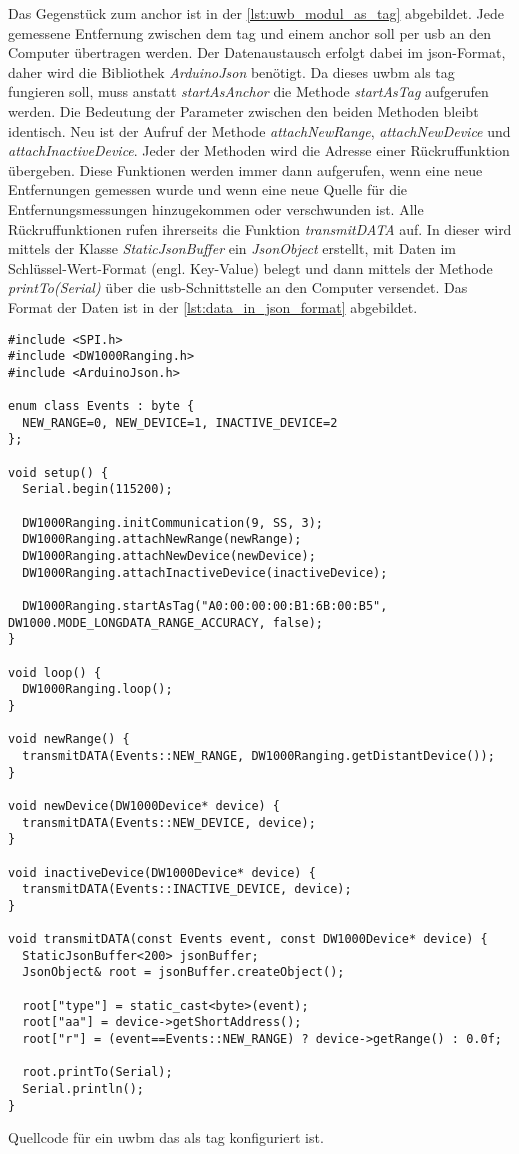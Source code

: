 Das Gegenstück zum \Gls{anchor} ist in der \autoref{lst:uwb_modul_as_tag} abgebildet. Jede gemessene Entfernung zwischen dem \Gls{tag} und einem \Gls{anchor} soll per \Gls{usb} an den Computer übertragen werden. Der Datenaustausch erfolgt dabei im \Gls{json}-Format, daher wird die Bibliothek \textit{ArduinoJson} benötigt.
Da dieses \Gls{uwbm} als \Gls{tag} fungieren soll, muss anstatt \textit{startAsAnchor} die Methode \textit{startAsTag} aufgerufen werden. Die Bedeutung der Parameter zwischen den beiden Methoden bleibt identisch.
Neu ist der Aufruf der Methode \textit{attachNewRange}, \textit{attachNewDevice} und \textit{attachInactiveDevice}. Jeder der Methoden wird die Adresse einer Rückruffunktion übergeben. Diese Funktionen werden immer dann aufgerufen, wenn eine neue Entfernungen gemessen wurde und wenn eine neue Quelle für die Entfernungsmessungen hinzugekommen oder verschwunden ist.
Alle Rückruffunktionen rufen ihrerseits die Funktion \textit{transmitDATA} auf. In dieser wird mittels der Klasse \textit{StaticJsonBuffer} ein \textit{JsonObject} erstellt, mit Daten im Schlüssel-Wert-Format (engl. Key-Value) belegt und dann mittels der Methode \textit{printTo(Serial)} über die \Gls{usb}-Schnittstelle an den Computer versendet. Das Format der Daten ist in der \autoref{lst:data_in_json_format} abgebildet.

\begin{listing}
	\begin{verbatim}
#include <SPI.h>
#include <DW1000Ranging.h>
#include <ArduinoJson.h>

enum class Events : byte {
  NEW_RANGE=0, NEW_DEVICE=1, INACTIVE_DEVICE=2
};

void setup() {
  Serial.begin(115200);
  
  DW1000Ranging.initCommunication(9, SS, 3);
  DW1000Ranging.attachNewRange(newRange);
  DW1000Ranging.attachNewDevice(newDevice);
  DW1000Ranging.attachInactiveDevice(inactiveDevice);

  DW1000Ranging.startAsTag("A0:00:00:00:B1:6B:00:B5", DW1000.MODE_LONGDATA_RANGE_ACCURACY, false);
}

void loop() {
  DW1000Ranging.loop();
}

void newRange() {
  transmitDATA(Events::NEW_RANGE, DW1000Ranging.getDistantDevice());
}

void newDevice(DW1000Device* device) {
  transmitDATA(Events::NEW_DEVICE, device);
}

void inactiveDevice(DW1000Device* device) {
  transmitDATA(Events::INACTIVE_DEVICE, device);
}

void transmitDATA(const Events event, const DW1000Device* device) {
  StaticJsonBuffer<200> jsonBuffer;
  JsonObject& root = jsonBuffer.createObject();

  root["type"] = static_cast<byte>(event);
  root["aa"] = device->getShortAddress();
  root["r"] = (event==Events::NEW_RANGE) ? device->getRange() : 0.0f;
  
  root.printTo(Serial);
  Serial.println();
}
	\end{verbatim}
	\unskip
	\caption{Quellcode für ein \Gls{uwbm} das als \Gls{tag} konfiguriert ist.}
	\label{lst:uwb_modul_as_tag}
\end{listing}


